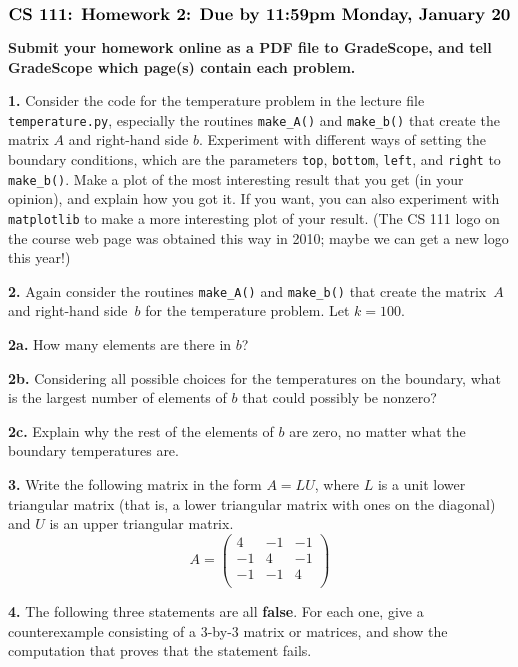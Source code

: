 \documentclass[11pt]{article}
\begin{document}
$$\mbox{\Large \bf CS 111: Homework 2: Due by 11:59pm Monday, January 20}$$

\medskip\noindent
{\bf Submit your homework online as a PDF file to GradeScope,
and tell GradeScope which page(s) contain each problem.}

\par\bigskip
{\bf 1.}
Consider the code for the temperature problem in 
the lecture file {\tt temperature.py}, 
especially the routines {\tt make\_A()} and {\tt make\_b()}
that create the matrix $A$ and right-hand side $b$.
Experiment with different ways of setting the boundary conditions,
which are the parameters {\tt top}, {\tt bottom}, {\tt left}, and {\tt right} 
to {\tt make\_b()}.
Make a plot of the most interesting result that you get (in your opinion), 
and explain how you got it. 
If you want, you can also experiment with {\tt matplotlib} 
to make a more interesting plot of your result. 
(The CS 111 logo on the course web page was obtained this way in 2010; 
maybe we can get a new logo this year!)

\par\bigskip
{\bf 2.}
Again consider the routines {\tt make\_A()} and {\tt make\_b()}
that create the matrix~$A$ and right-hand side~$b$ for the temperature problem.
Let $k=100$.

\par\medskip
{\bf 2a.}
How many elements are there in $b$?

\par\medskip
{\bf 2b.}
Considering all possible choices for the temperatures on the boundary,
what is the largest number of elements of $b$ that could possibly 
be nonzero? 

\par\medskip
{\bf 2c.}
Explain why the rest of the elements of $b$ are zero, no matter
what the boundary temperatures are.

\par\bigskip
{\bf 3.}
Write the following matrix in the form $A=LU$, 
where $L$ is a unit lower triangular matrix
(that is, a lower triangular matrix with ones on the diagonal) 
and $U$ is an upper triangular matrix.
$$A =
   \left(
   \begin{array}{ccc}
    4 & -1 & -1 \\ 	
   -1 &  4 & -1 \\ 
   -1 & -1 &  4 \\
   \end{array} \right)
$$

\par\bigskip
{\bf 4.}
The following three statements are all {\bf false}. For each one, 
give a counterexample consisting of a 3-by-3 matrix or matrices, 
and show the computation that proves that the statement fails.
\end{document}
